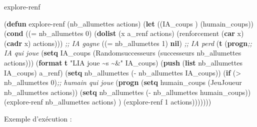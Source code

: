 \documentclass[
]{article}
\newenvironment{Shaded}{}{}
\newcommand{\CommentTok}[1]{\textcolor[rgb]{0.38,0.63,0.69}{\textit{#1}}}
\newcommand{\DecValTok}[1]{\textcolor[rgb]{0.25,0.63,0.44}{#1}}
\newcommand{\FunctionTok}[1]{\textcolor[rgb]{0.02,0.16,0.49}{#1}}
\newcommand{\KeywordTok}[1]{\textcolor[rgb]{0.00,0.44,0.13}{\textbf{#1}}}
\newcommand{\NormalTok}[1]{#1}
\newcommand{\OperatorTok}[1]{\textcolor[rgb]{0.40,0.40,0.40}{#1}}
\newcommand{\StringTok}[1]{\textcolor[rgb]{0.25,0.44,0.63}{#1}}
\begin{document}
\begin{Shaded}
    \begin{algorithm}[H]
    \caption{explore-renf}
    \begin{Highlighting}[]
\NormalTok{(}\KeywordTok{defun}\FunctionTok{ explore{-}renf }\NormalTok{(nb\_allumettes actions)}
\NormalTok{  (}\KeywordTok{let}\NormalTok{ ((IA\_coups ) (humain\_coups))}
\NormalTok{    (}\KeywordTok{cond} 
\NormalTok{     ((}\OperatorTok{=}\NormalTok{ nb\_allumettes }\DecValTok{0}\NormalTok{) }
\NormalTok{        (}\KeywordTok{dolist}\NormalTok{ (x a\_renf actions)}
\NormalTok{          (renforcement (}\KeywordTok{car}\NormalTok{ x) (}\KeywordTok{cadr}\NormalTok{ x) actions)))} \CommentTok{;; IA gagne}
\NormalTok{     ((}\OperatorTok{=}\NormalTok{ nb\_allumettes }\DecValTok{1}\NormalTok{) }\KeywordTok{nil}\NormalTok{) }\CommentTok{;; IA perd}
\NormalTok{     (}\KeywordTok{t} \NormalTok{(}\KeywordTok{progn}\CommentTok{;; IA qui joue}  
\NormalTok{            (}\KeywordTok{setq}\NormalTok{ IA\_coups (Randomsuccesseurs (successeurs nb\_allumettes actions)))}
\NormalTok{            (}\KeywordTok{format} \KeywordTok{t} \StringTok{"L\textquotesingle{}IA joue \textasciitilde{}s \textasciitilde{}\&"}\NormalTok{ IA\_coups)}
\NormalTok{            (}\KeywordTok{push}\NormalTok{ (}\KeywordTok{list}\NormalTok{ nb\_allumettes IA\_coups) a\_renf)}
\NormalTok{            (}\KeywordTok{setq}\NormalTok{ nb\_allumettes (}\OperatorTok{{-}}\NormalTok{ nb\_allumettes IA\_coups))} 
\NormalTok{        (}\KeywordTok{if}\NormalTok{ (}\OperatorTok{\textgreater{}}\NormalTok{ nb\_allumettes }\DecValTok{0}\NormalTok{)}\CommentTok{;; humain qui joue}
\NormalTok{            (}\KeywordTok{progn}
\NormalTok{            (}\KeywordTok{setq}\NormalTok{ humain\_coups (JeuJoueur nb\_allumettes actions))}
\NormalTok{            (}\KeywordTok{setq}\NormalTok{ nb\_allumettes (}\OperatorTok{{-}}\NormalTok{ nb\_allumettes humain\_coups))}
\NormalTok{            (explore{-}renf nb\_allumettes actions)}
\NormalTok{              )}
\NormalTok{          (explore{-}renf }\DecValTok{1}\NormalTok{ actions)))))))}
\end{Highlighting}
\end{algorithm}
\end{Shaded}

Exemple d'exécution :
\end{document}
